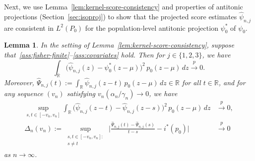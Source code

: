 \documentclass[a4paper]{article}
\newcommand{\R}{\mathbb{R}}
\newcommand{\cvp}{\overset{p}{\to}}
\newtheorem{lemma}[theorem]{Lemma}
\theoremstyle{definition}
\begin{document}
Next, we use Lemma~\ref{lem:kernel-score-consistency} and properties of antitonic projections (Section~\ref{sec:isoproj}) to show that the projected score estimates $\hat{\psi}_{n,j}$ are consistent in $L^2(P_0)$ for the population-level antitonic projection $\psi_0^*$ of $\psi_0$.

\begin{lemma}
\label{lem:proj-score-consistency}
In the setting of Lemma~\ref{lem:kernel-score-consistency}, suppose that~\emph{\ref{ass:fisher-finite}--\ref{ass:covariates}} hold. Then for $j \in \{1,2,3\}$, we have
\begin{equation}
\label{eq:proj-score-consistency}
\int_\R \bigl(\hat{\psi}_{n,j}(z) - \psi_0^*(z - \mu)\bigr)^2\,p_0(z - \mu)\,dz \cvp 0.
\end{equation}
Moreover, $\hat{\Psi}_{n,j}(t) := \int_\R \hat{\psi}_{n,j}(z - t)\,p_0(z - \mu)\,dz \in \R$ for all $t \in \R$, and for any sequence $(v_n)$ satisfying $v_n(\alpha_n/\gamma_n) \to 0$, we have
\begin{align}
\label{eq:proj-score-consistency-1}
\sup_{s,t \in [-v_n,v_n]} \int_\R \bigl(\hat{\psi}_{n,j}(z - t) - \hat{\psi}_{n,j}(z - s)\bigr)^2\,p_0(z - \mu)\,dz &\cvp 0, \\ 
\label{eq:proj-score-consistency-2}
\Delta_n(v_n) := \sup_{\substack{s,t \in [-v_n,v_n] : \\ s \neq t}}\, \biggl|\frac{\hat{\Psi}_{n,j}(t) - \hat{\Psi}_{n,j}(s)}{t - s} - i^*(p_0)\biggr| &\cvp 0
\end{align}
as $n \to \infty$.
\end{lemma}
\end{document}
